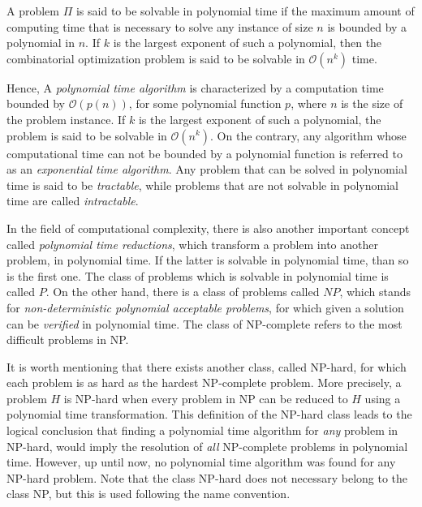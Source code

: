 A problem $\Pi$ is said to be solvable in polynomial time if the maximum amount of computing time that is necessary to solve any instance of size $n$ 
is bounded by a polynomial in $n$. If $k$ is the largest exponent of such a polynomial,
then the combinatorial optimization problem is said to be solvable in $\mathcal{O}(n^k)$ time.

Hence, A \textit{polynomial time algorithm} is characterized by a computation time bounded by $\mathcal{O}(p(n))$, for some polynomial function $p$, 
where $n$ is the size of the problem instance. If $k$ is the largest exponent of such a polynomial, 
the problem is said to be solvable in $\mathcal{O}(n^k)$. On the contrary, 
any algorithm whose computational time can not be bounded by a polynomial function is referred to as an \textit{exponential time algorithm}.
Any problem that can be solved in polynomial time is said to be \textit{tractable}, while problems that 
are not solvable in polynomial time are called \textit{intractable}.

In the field of computational complexity, there is also another important concept called \textit{polynomial time reductions},
which transform a problem into another problem, in polynomial time. If the latter 
is solvable in polynomial time, than so is the first one. The class of problems which is solvable in polynomial time is called $P$.
On the other hand, there is a class of problems called $NP$, which stands for \textit{non-deterministic polynomial acceptable problems},
for which given a solution can be \textit{verified} in polynomial time.    
The class of NP-complete refers to the most difficult problems in NP.

It is worth mentioning that there exists another class, called NP-hard, for which each problem is as hard as the hardest NP-complete problem.
More precisely, a problem $H$ is NP-hard when every problem in NP can be reduced to $H$ using a polynomial time transformation.
This definition of the NP-hard class leads to the logical conclusion that finding a polynomial time algorithm for \textit{any} problem in NP-hard,
would imply the resolution of \textit{all} NP-complete problems in polynomial time. However, up until now, no polynomial time algorithm was found for any NP-hard problem.
Note that the class NP-hard does not necessary belong to the class NP, but this is used following the name convention.

